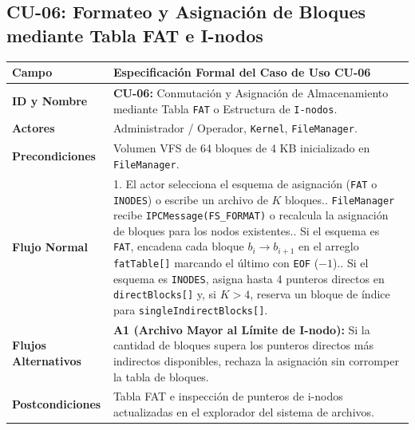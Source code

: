 \documentclass[10pt,twocolumn,letterpaper]{article}
\begin{document}
\subsection{CU-06: Formateo y Asignaci\'on de Bloques mediante Tabla FAT e I-nodos}
\begin{table}[!htb]
\centering
\scriptsize
\renewcommand{\arraystretch}{1.12}
\begin{tabularx}{\columnwidth}{L{2.1cm} Y}
\toprule
\textbf{Campo} & \textbf{Especificaci\'on Formal del Caso de Uso CU-06} \\
\midrule
\textbf{ID y Nombre} & \textbf{CU-06:} Conmutaci\'on y Asignaci\'on de Almacenamiento mediante Tabla \texttt{FAT} o Estructura de \texttt{I-nodos}. \\
\textbf{Actores} & Administrador / Operador, \texttt{Kernel}, \texttt{FileManager}. \\
\textbf{Precondiciones} & Volumen VFS de 64 bloques de 4 KB inicializado en \texttt{FileManager}. \\
\textbf{Flujo Normal} & 1. El actor selecciona el esquema de asignaci\'on (\texttt{FAT} o \texttt{INODES}) o escribe un archivo de $K$ bloques.. \texttt{FileManager} recibe \texttt{IPCMessage(FS\_FORMAT)} o recalcula la asignaci\'on de bloques para los nodos existentes.. Si el esquema es \texttt{FAT}, encadena cada bloque $b_i \rightarrow b_{i+1}$ en el arreglo \texttt{fatTable[]} marcando el \'ultimo con \texttt{EOF} ($-1$).. Si el esquema es \texttt{INODES}, asigna hasta 4 punteros directos en \texttt{directBlocks[]} y, si $K > 4$, reserva un bloque de \'indice para \texttt{singleIndirectBlocks[]}. \\
\textbf{Flujos Alternativos} & \textbf{A1 (Archivo Mayor al L\'imite de I-nodo):} Si la cantidad de bloques supera los punteros directos m\'as indirectos disponibles, rechaza la asignaci\'on sin corromper la tabla de bloques. \\
\textbf{Postcondiciones} & Tabla FAT e inspecci\'on de punteros de i-nodos actualizadas en el explorador del sistema de archivos. \\
\bottomrule
\end{tabularx}
\end{table}
\end{document}
